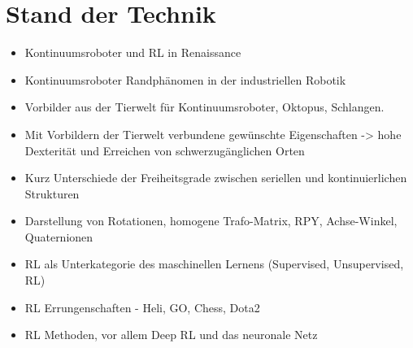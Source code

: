 \chapter{Stand der Technik}


\begin{itemize}
\item Kontinuumsroboter und RL in Renaissance
\item Kontinuumsroboter Randphänomen in der industriellen Robotik
\item Vorbilder aus der Tierwelt für Kontinuumsroboter, Oktopus, Schlangen.
\item Mit Vorbildern der Tierwelt verbundene gewünschte Eigenschaften -> hohe Dexterität und Erreichen von schwerzugänglichen Orten
\item Kurz Unterschiede der Freiheitsgrade zwischen seriellen und kontinuierlichen Strukturen
\item Darstellung von Rotationen, homogene Trafo-Matrix, RPY, Achse-Winkel, Quaternionen
\\
\item RL als Unterkategorie des maschinellen Lernens (Supervised, Unsupervised, RL)
\item RL Errungenschaften - Heli, GO, Chess, Dota2 
\item RL Methoden, vor allem Deep RL und das neuronale Netz
\end{itemize}